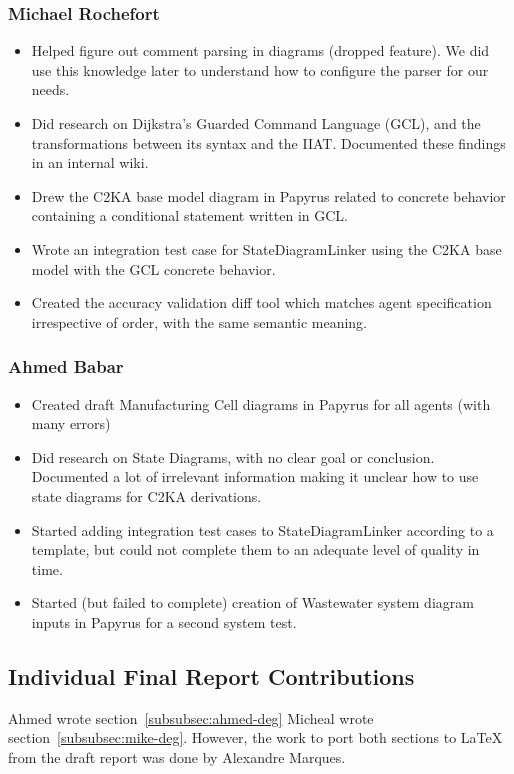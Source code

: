 \subsubsection{Michael Rochefort}
\begin{itemize}
    \item Helped figure out comment parsing in diagrams (dropped feature).
We did use this knowledge later to understand how to configure the parser for our needs.
    \item Did research on Dijkstra's Guarded Command Language (GCL), and the transformations between its syntax and the IIAT.
    Documented these findings in an internal wiki.
    \item Drew the C2KA base model diagram in Papyrus related to concrete behavior containing a conditional statement written in GCL.
    \item Wrote an integration test case for StateDiagramLinker using the C2KA base model with the GCL concrete behavior.
    \item Created the accuracy validation diff tool which matches agent specification irrespective of order, with the same semantic meaning.
\end{itemize}

\subsubsection{Ahmed Babar}
\begin{itemize}
    \item Created draft Manufacturing Cell diagrams in Papyrus for all agents (with many errors)
    \item Did research on State Diagrams, with no clear goal or conclusion.
    Documented a lot of irrelevant information making it unclear how to use state diagrams for C2KA derivations.
    \item Started adding integration test cases to StateDiagramLinker according to a template,
    but could not complete them to an adequate level of quality in time.
    \item Started (but failed to complete) creation of Wastewater system diagram inputs in Papyrus for a second system test.
\end{itemize}

\subsection{Individual Final Report Contributions}\label{subsec:individual-final-report-contributions}
Ahmed wrote section~\ref{subsubsec:ahmed-deg}
Micheal wrote section~\ref{subsubsec:mike-deg}.
However, the work to port both sections to LaTeX from the draft report was done by Alexandre Marques.


